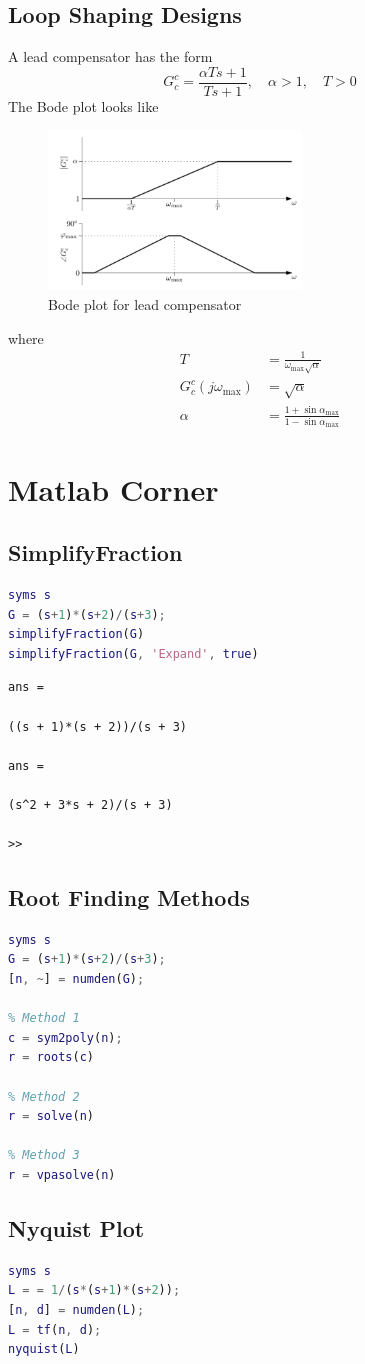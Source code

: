 \documentclass[letterpaper,12pt]{article}
\begin{document}
\subsection{Loop Shaping Designs}
A lead compensator has the form
\begin{equation*}
    G_{c}^{c} = \frac{\alpha T s +1 }{Ts+1}, \quad \alpha >1, \quad T>0
\end{equation*}
The Bode plot looks like 
\begin{figure}[h]
    \centering
    \includegraphics[width=0.6\textwidth]{section6 lead compensator.png}
    \caption{Bode plot for lead compensator}
\end{figure}
where
\begin{align*}
    T &= \frac{1}{\omega_{\max} \sqrt{\alpha}} \\
    G_{c}^{c}(j\omega_{\max}) &= \sqrt{\alpha} \\
    \alpha &= \frac{1+ \sin\alpha_{\max}}{1 - \sin\alpha_{\max}}
\end{align*}

\section{Matlab Corner}
\subsection{SimplifyFraction}
\begin{lstlisting}[language=Matlab]
syms s
G = (s+1)*(s+2)/(s+3);
simplifyFraction(G)
simplifyFraction(G, 'Expand', true)
\end{lstlisting}
\begin{verbatim}
ans =

((s + 1)*(s + 2))/(s + 3)

ans =

(s^2 + 3*s + 2)/(s + 3)

>> 
\end{verbatim}

\subsection{Root Finding Methods}
\begin{lstlisting}[language=Matlab]
syms s
G = (s+1)*(s+2)/(s+3);
[n, ~] = numden(G);

% Method 1  
c = sym2poly(n);
r = roots(c)

% Method 2
r = solve(n)

% Method 3
r = vpasolve(n)
\end{lstlisting}

\subsection{Nyquist Plot}
\begin{lstlisting}[language=Matlab]
syms s
L = = 1/(s*(s+1)*(s+2));
[n, d] = numden(L);
L = tf(n, d);
nyquist(L)
\end{lstlisting}
\end{document}
